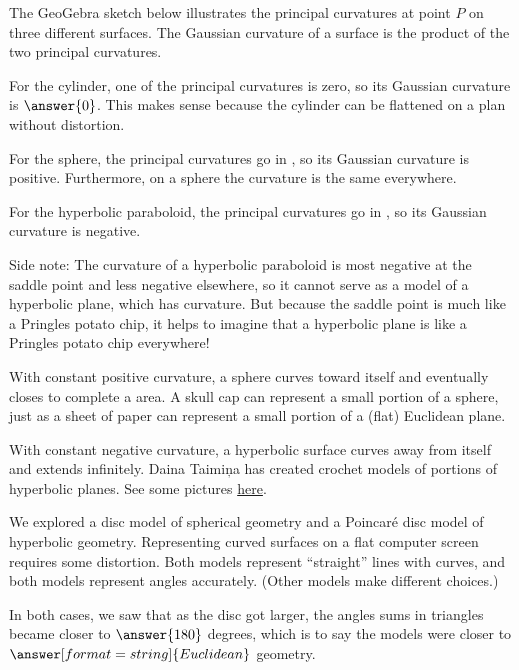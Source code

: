 \documentclass{ximera}
\begin{document}
\begin{problem}
The GeoGebra sketch below illustrates the principal curvatures at point $P$ on three different surfaces.  The Gaussian curvature of a surface is the product of the two principal curvatures.  
\begin{center}
\end{center}

For the cylinder, one of the principal curvatures is zero, so its Gaussian curvature is $\answer{0}$.  This makes sense because the cylinder can be flattened on a plan without distortion.  

For the sphere, the principal curvatures go in , so its Gaussian curvature is positive.  Furthermore, on a sphere the curvature is the same everywhere.  
 
For the hyperbolic paraboloid, the principal curvatures go in , so its Gaussian curvature is 
negative.  

Side note: The curvature of a hyperbolic paraboloid is most negative at the saddle point and less negative elsewhere, so it cannot serve as a model of a hyperbolic plane, which has  curvature.  But because the saddle point is much like a Pringles potato chip, it helps to imagine that a hyperbolic plane is like a Pringles potato chip everywhere!  
\end{problem}

\begin{problem}
With constant positive curvature, a sphere curves toward itself and eventually closes to complete a  area.  A skull cap can represent a small portion of a sphere, just as a sheet of paper can represent a small portion of a (flat) Euclidean plane.  

With constant negative curvature, a hyperbolic surface curves away from itself and extends infinitely.  Daina Taimi\c{n}a has created crochet models of portions of hyperbolic planes.  See some pictures \href{https://www.theiff.org/oexhibits/oe1e.html}{here}.  

We explored a disc model of spherical geometry and a Poincaré disc model of hyperbolic geometry.  Representing curved surfaces on a flat computer screen requires some distortion.  Both models represent ``straight'' lines with curves, and both models represent angles accurately.  (Other models make different choices.)

In both cases, we saw that as the disc got larger, the angles sums in triangles became closer to $\answer{180}$ degrees, which is to say the models were closer to $\answer[format=string]{Euclidean}$ geometry.  
\end{problem}
\end{document}
